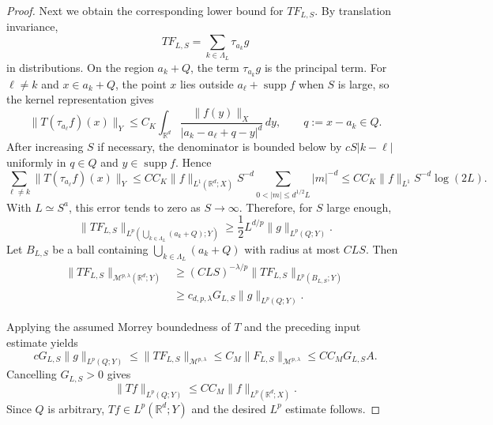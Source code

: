 \documentclass[10pt,a4paper]{amsart}
\newcommand{\R}{\mathbb R}
\begin{document}
\begin{proof}
		Next we obtain the corresponding lower bound for $TF_{L,S}$.  By translation invariance,
		\[
		TF_{L,S}=\sum_{k\in\Lambda_L}\tau_{a_k}g
		\]
		in distributions.  On the region $a_k+Q$, the term $\tau_{a_k}g$ is the principal term.  For $\ell\ne k$ and $x\in a_k+Q$, the point $x$ lies outside $a_\ell+\operatorname{supp}f$ when $S$ is large, so the kernel representation gives
		\[
		\|T(\tau_{a_\ell}f)(x)\|_Y
		\le
		C_K\int_{\R^d}\frac{\|f(y)\|_X}{|a_k-a_\ell+q-y|^d}\,dy,
		\qquad q:=x-a_k\in Q.
		\]
		After increasing $S$ if necessary, the denominator is bounded below by $cS|k-\ell|$ uniformly in $q\in Q$ and $y\in\operatorname{supp}f$.  Hence
		\[
		\sum_{\ell\ne k}\|T(\tau_{a_\ell}f)(x)\|_Y
		\le
		C C_K\|f\|_{L^1(\R^d;X)}S^{-d}
		\sum_{0<|m|\le d^{1/2}L}|m|^{-d}
		\le
		C C_K\|f\|_{L^1}S^{-d}\log(2L).
		\]
		With $L\simeq S^a$, this error tends to zero as $S\to\infty$.  Therefore, for $S$ large enough,
		\[
		\|TF_{L,S}\|_{L^p(\bigcup_{k\in\Lambda_L}(a_k+Q);Y)}
		\ge
		\frac12 L^{d/p}\|g\|_{L^p(Q;Y)}.
		\]
		Let $B_{L,S}$ be a ball containing $\bigcup_{k\in\Lambda_L}(a_k+Q)$ with radius at most $C LS$.  Then
		\[
		\begin{aligned}
		\|TF_{L,S}\|_{\mathcal M^{p,\lambda}(\R^d;Y)}
		&\ge
		(CLS)^{-\lambda/p}
		\|TF_{L,S}\|_{L^p(B_{L,S};Y)} \\
		&\ge
		c_{d,p,\lambda}G_{L,S}\|g\|_{L^p(Q;Y)}.
		\end{aligned}
		\]

		Applying the assumed Morrey boundedness of $T$ and the preceding input estimate yields
		\[
		cG_{L,S}\|g\|_{L^p(Q;Y)}
		\le
		\|TF_{L,S}\|_{\mathcal M^{p,\lambda}}
		\le
		C_M\|F_{L,S}\|_{\mathcal M^{p,\lambda}}
		\le
		C C_M G_{L,S}A.
		\]
		Cancelling $G_{L,S}>0$ gives
		\[
		\|Tf\|_{L^p(Q;Y)}\le C C_M\|f\|_{L^p(\R^d;X)}.
		\]
		Since $Q$ is arbitrary, $Tf\in L^p(\R^d;Y)$ and the desired $L^p$ estimate follows.
	\end{proof}
\end{document}
